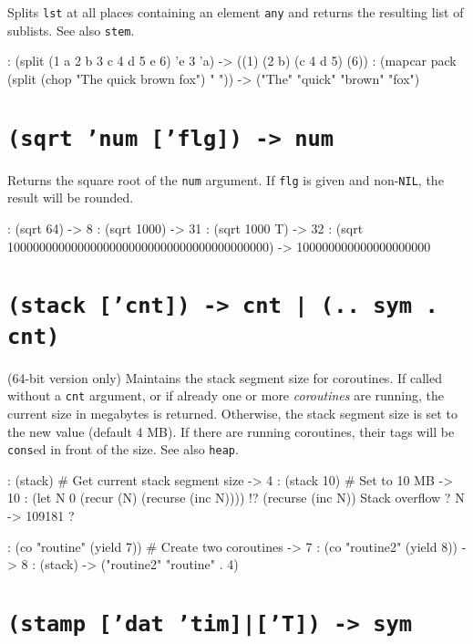 Splits \texttt{lst} at all places containing an element \texttt{any} and returns the
resulting list of sublists. See also \texttt{stem}.


\begin{wideverbatim}
: (split (1 a 2 b 3 c 4 d 5 e 6) 'e 3 'a)
-> ((1) (2 b) (c 4 d 5) (6))
: (mapcar pack (split (chop "The quick brown fox") " "))
-> ("The" "quick" "brown" "fox")
\end{wideverbatim}

 
\section*{\texttt{(sqrt 'num ['flg]) -> num}}
\label{sec:func-ref-S-(sqrt 'num ['flg]) -> num}


Returns the square root of the \texttt{num} argument. If \texttt{flg} is given and
non-\texttt{NIL}, the result will be rounded.


\begin{wideverbatim}
: (sqrt 64)
-> 8
: (sqrt 1000)
-> 31
: (sqrt 1000 T)
-> 32
: (sqrt 10000000000000000000000000000000000000000)
-> 100000000000000000000
\end{wideverbatim}

 
\section*{\texttt{(stack ['cnt]) -> cnt | (.. sym . cnt)}}
\label{sec:func-ref-S-(stack ['cnt]) -> cnt | (.. sym . cnt)}


(64-bit version only) Maintains the stack segment size for coroutines.
If called without a \texttt{cnt} argument, or if already one or more
\emph{coroutines} are running, the current size in
megabytes is returned. Otherwise, the stack segment size is set to the
new value (default 4 MB). If there are running coroutines, their tags
will be \texttt{cons}ed in front of the size. See also \texttt{heap}.


\begin{wideverbatim}
: (stack)         # Get current stack segment size
-> 4
: (stack 10)      # Set to 10 MB
-> 10
: (let N 0 (recur (N) (recurse (inc N))))
!? (recurse (inc N))
Stack overflow
? N
-> 109181
?

: (co "routine" (yield 7))  # Create two coroutines
-> 7
: (co "routine2" (yield 8))
-> 8
: (stack)
-> ("routine2" "routine" . 4)
\end{wideverbatim}

 
\section*{\texttt{(stamp ['dat 'tim]|['T]) -> sym}}
\label{sec:func-ref-S-(stamp ['dat 'tim]|['T]) -> sym}


